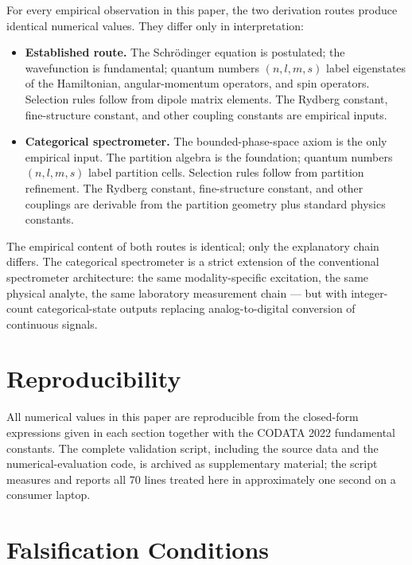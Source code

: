 \documentclass[11pt,a4paper]{article}
\theoremstyle{stmtstyle}
\theoremstyle{definition}
\theoremstyle{remark}
\begin{document}
For every empirical observation in this paper, the two derivation routes produce identical numerical values. They differ only in interpretation:

\begin{itemize}[nosep]
\item \textbf{Established route.} The Schr\"odinger equation is postulated; the wavefunction is fundamental; quantum numbers $(n, l, m, s)$ label eigenstates of the Hamiltonian, angular-momentum operators, and spin operators. Selection rules follow from dipole matrix elements. The Rydberg constant, fine-structure constant, and other coupling constants are empirical inputs.
\item \textbf{Categorical spectrometer.} The bounded-phase-space axiom is the only empirical input. The partition algebra is the foundation; quantum numbers $(n, l, m, s)$ label partition cells. Selection rules follow from partition refinement. The Rydberg constant, fine-structure constant, and other couplings are derivable from the partition geometry plus standard physics constants.
\end{itemize}

The empirical content of both routes is identical; only the explanatory chain differs. The categorical spectrometer is a strict extension of the conventional spectrometer architecture: the same modality-specific excitation, the same physical analyte, the same laboratory measurement chain --- but with integer-count categorical-state outputs replacing analog-to-digital conversion of continuous signals.

\section{Reproducibility}
\label{sec:reproducibility}

All numerical values in this paper are reproducible from the closed-form expressions given in each section together with the CODATA 2022 fundamental constants. The complete validation script, including the source data and the numerical-evaluation code, is archived as supplementary material; the script measures and reports all 70 lines treated here in approximately one second on a consumer laptop.

\section{Falsification Conditions}
\label{sec:falsification}
\end{document}
